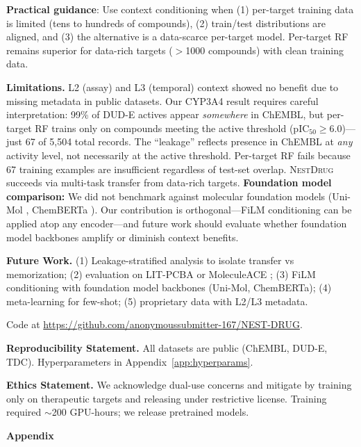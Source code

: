 \documentclass[sigconf,anonymous]{acmart}
\newcommand{\methodname}{\textsc{NestDrug}}
\begin{document}
\textbf{Practical guidance}: Use context conditioning when (1) per-target training data is limited (tens to hundreds of compounds), (2) train/test distributions are aligned, and (3) the alternative is a data-scarce per-target model. Per-target RF remains superior for data-rich targets ($>$1000 compounds) with clean training data.

\textbf{Limitations.} L2 (assay) and L3 (temporal) context showed no benefit due to missing metadata in public datasets. Our CYP3A4 result requires careful interpretation: 99\% of DUD-E actives appear \textit{somewhere} in ChEMBL, but per-target RF trains only on compounds meeting the active threshold (pIC$_{50} \geq 6.0$)---just 67 of 5,504 total records. The ``leakage'' reflects presence in ChEMBL at \textit{any} activity level, not necessarily at the active threshold. Per-target RF fails because 67 training examples are insufficient regardless of test-set overlap. \methodname{} succeeds via multi-task transfer from data-rich targets. \textbf{Foundation model comparison:} We did not benchmark against molecular foundation models (Uni-Mol \cite{zhou_2023_unimol}, ChemBERTa \cite{chithrananda_2020_chemberta}). Our contribution is orthogonal---FiLM conditioning can be applied atop any encoder---and future work should evaluate whether foundation model backbones amplify or diminish context benefits.

\textbf{Future Work.} (1) Leakage-stratified analysis to isolate transfer vs memorization; (2) evaluation on LIT-PCBA \cite{tran_2020_litpcba} or MoleculeACE \cite{van_tilborg_2024_moleculeace}; (3) FiLM conditioning with foundation model backbones (Uni-Mol, ChemBERTa); (4) meta-learning for few-shot; (5) proprietary data with L2/L3 metadata.

Code at \url{https://github.com/anonymoussubmitter-167/NEST-DRUG}.

\textbf{Reproducibility Statement.}
All datasets are public (ChEMBL, DUD-E, TDC). Hyperparameters in Appendix~\ref{app:hyperparams}.

\textbf{Ethics Statement.}
We acknowledge dual-use concerns and mitigate by training only on therapeutic targets and releasing under restrictive license. Training required $\sim$200 GPU-hours; we release pretrained models.

\FloatBarrier



\FloatBarrier
\clearpage
\appendix

\begin{center}
\Large\textbf{Appendix}
\end{center}
\vspace{1em}
\FloatBarrier
\end{document}
